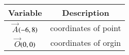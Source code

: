 \begin{tabular}[12pt]{ |c| c|}
    \hline
        \textbf{Variable}  & \textbf{Description}\\
    \hline
        $\vec{A}$$\left(-6,8\right)$ &  coordinates of point\\
    \hline 
        $\vec{O}$$\left(0,0\right)$ & coordinates of orgin\\
    \hline 
\end{tabular}
